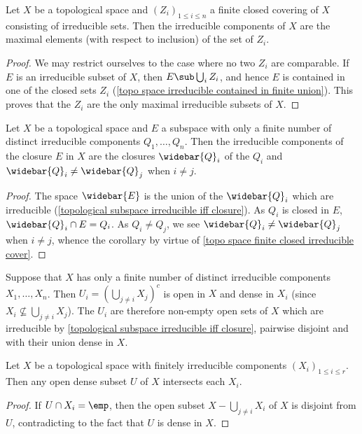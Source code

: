 \begin{proposition}\label{topo space finite closed irreducible cover}
Let $X$ be a topological space and $(Z_i)_{1\leq i\leq n}$ a finite closed covering of $X$ consisting of irreducible sets. Then the irreducible components of $X$ are the maximal elements (with respect to inclusion) of the set of $Z_i$.
\end{proposition}
\begin{proof}
We may restrict ourselves to the case where no two $Z_i$ are comparable. If $E$ is an irreducible subset of $X$, then $E\sub\bigcup_iZ_i$, and hence $E$ is contained in one of the closed sets $Z_i$ (\cref{topo space irreducible contained in finite union}). This proves that the $Z_i$ are the only maximal irreducible subsets of $X$.
\end{proof}
\begin{corollary}\label{topo space subspace finite irre component prop}
Let $X$ be a topological space and $E$ a subspace with only a finite number of distinct irreducible components $Q_1,\dots,Q_n$. Then the irreducible components of the closure $E$ in $X$ are the closures $\widebar{Q}_i$ of the $Q_i$ and $\widebar{Q}_i\neq\widebar{Q}_j$ when $i\neq j$.
\end{corollary}
\begin{proof}
The space $\widebar{E}$ is the union of the $\widebar{Q}_i$ which are irreducible (\cref{topological subspace irreducible iff closure}). As $Q_i$ is closed in $E$, $\widebar{Q}_i\cap E=Q_i$. As $Q_i\neq Q_j$, we see $\widebar{Q}_i\neq\widebar{Q}_j$ when $i\neq j$, whence the corollary by virtue of \cref{topo space finite closed irreducible cover}.
\end{proof}
\begin{example}
Suppose that $X$ has only a finite number of distinct irreducible components $X_1,\dots,X_n$. Then $U_i=(\bigcup_{j\neq i}X_j)^c$ is open in $X$ and dense in $X_i$ (since $X_i\nsubseteq\bigcup_{j\neq i}X_j$). The $U_i$ are therefore non-empty open sets of $X$ which are irreducible by \cref{topological subspace irreducible iff closure}, pairwise disjoint and with their union dense in $X$.
\end{example}
\begin{proposition}\label{topo space open dense intersect irre component}
Let $X$ be a topological space with finitely irreducible components $(X_i)_{1\leq i\leq r}$. Then any open dense subset $U$ of $X$ intersects each $X_i$.
\end{proposition}
\begin{proof}
If $U\cap X_i=\emp$, then the open subset $X-\bigcup_{j\neq i}X_i$ of $X$ is disjoint from $U$, contradicting to the fact that $U$ is dense in $X$.
\end{proof}
